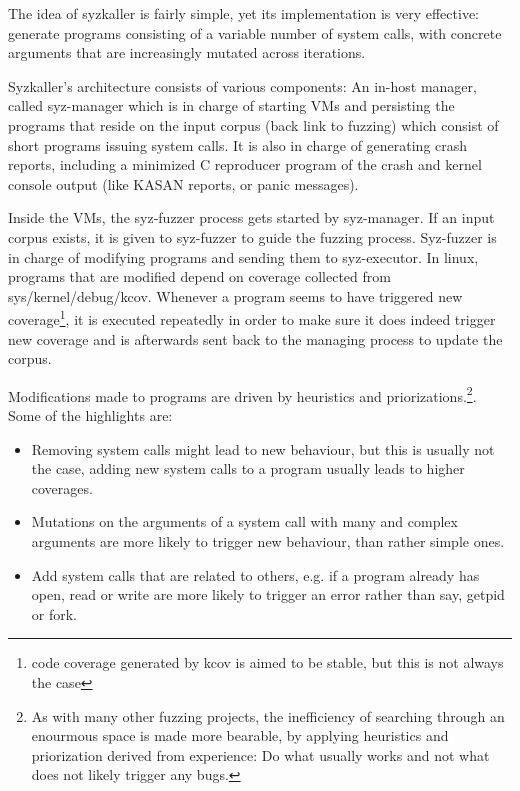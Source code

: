 The idea of syzkaller is fairly simple, yet its implementation is very effective: generate programs consisting of a variable number of system calls, with
concrete arguments that are increasingly mutated across iterations.


Syzkaller's architecture consists of various components: An in-host manager, called
syz-manager which is in charge of starting VMs and persisting the programs that
reside on the input corpus (back link to fuzzing) which consist of short programs issuing
system calls. It is also in charge of generating crash reports, including a minimized C reproducer program of the crash and kernel console output (like KASAN reports, or panic
messages).

Inside the VMs, the syz-fuzzer process gets started by syz-manager. If an input
corpus exists, it is given to syz-fuzzer to guide the fuzzing process. Syz-fuzzer is
in charge of modifying programs and sending them to syz-executor. In linux, programs that
are modified depend on coverage collected from sys/kernel/debug/kcov. Whenever a program seems to have triggered new coverage\footnote{code coverage generated by kcov is aimed to be stable, but this is not always the case},
it is executed repeatedly in order to make sure it does indeed trigger new coverage and is
afterwards sent back to the managing process to update the corpus.

Modifications made to programs are driven by heuristics and priorizations.\footnote{As with many other fuzzing projects, the inefficiency of searching through an enourmous space is made more bearable, by applying heuristics and priorization derived from experience: Do what usually works and not what does not likely trigger any bugs.}. Some of the highlights are\cite{bluehatil2020}:

\begin{itemize}
  \item Removing system calls might lead to new behaviour, but this is usually not the case, adding new system calls to a program usually leads to higher coverages.
  \item Mutations on the arguments of a  system call with many and complex arguments are more likely to trigger new behaviour, than rather simple ones.
  \item Add system calls that are related to others, e.g. if a program already has open, read or write are more likely to trigger an error rather than say, getpid or fork.
\end{itemize}


